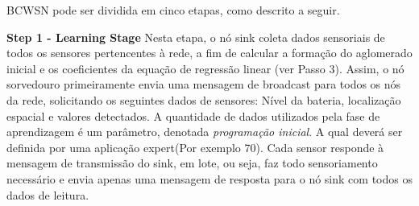 \documentclass{acm_proc_article-sp}
\begin{document}



BCWSN pode ser dividida em cinco etapas, como descrito a seguir. 
\vspace*{-.3cm}

{\bf Step 1 - Learning Stage}
Nesta etapa, o nó sink coleta dados sensoriais de todos os sensores
{pertencentes à rede}, a fim de calcular a formação do aglomerado inicial e os
coeficientes da equação de regressão linear (ver Passo 3). Assim, o nó sorvedouro primeiramente envia uma mensagem de
broadcast para todos os nós da rede, solicitando os seguintes dados de sensores: Nível da bateria,
localização espacial e valores detectados. A quantidade de dados utilizados pela fase de
aprendizagem é um parâmetro, denotada \textit{programação inicial}. A qual
deverá ser definida por uma aplicação expert(Por exemplo 70). Cada sensor responde à mensagem de transmissão
do sink, em lote, ou seja, faz todo sensoriamento necessário e envia apenas uma mensagem de resposta para o
nó sink com todos os dados de leitura.
\vspace*{-.3cm}
\end{document}
